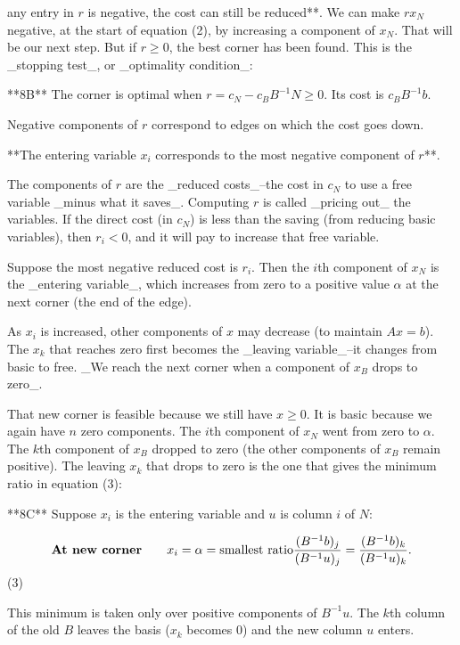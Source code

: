 any entry in \(r\) is negative, the cost can still be reduced**. We can make \(rx_{N}\) negative, at the start of equation (2), by increasing a component of \(x_{N}\). That will be our next step. But if \(r\geq 0\), the best corner has been found. This is the _stopping test_, or _optimality condition_:

**8B** The corner is optimal when \(r=c_{N}-c_{B}B^{-1}N\geq 0\). Its cost is \(c_{B}B^{-1}b\).

Negative components of \(r\) correspond to edges on which the cost goes down.

**The entering variable \(x_{i}\) corresponds to the most negative component of \(r\)**.

The components of \(r\) are the _reduced costs_--the cost in \(c_{N}\) to use a free variable _minus what it saves_. Computing \(r\) is called _pricing out_ the variables. If the direct cost (in \(c_{N}\)) is less than the saving (from reducing basic variables), then \(r_{i}<0\), and it will pay to increase that free variable.

Suppose the most negative reduced cost is \(r_{i}\). Then the \(i\)th component of \(x_{N}\) is the _entering variable_, which increases from zero to a positive value \(\alpha\) at the next corner (the end of the edge).

As \(x_{i}\) is increased, other components of \(x\) may decrease (to maintain \(Ax=b\)). The \(x_{k}\) that reaches zero first becomes the _leaving variable_--it changes from basic to free. _We reach the next corner when a component of \(x_{B}\) drops to zero_.

That new corner is feasible because we still have \(x\geq 0\). It is basic because we again have \(n\) zero components. The \(i\)th component of \(x_{N}\) went from zero to \(\alpha\). The \(k\)th component of \(x_{B}\) dropped to zero (the other components of \(x_{B}\) remain positive). The leaving \(x_{k}\) that drops to zero is the one that gives the minimum ratio in equation (3):

**8C** Suppose \(x_{i}\) is the entering variable and \(u\) is column \(i\) of \(N\):

\[\mbox{\bf At new corner}\qquad x_{i}=\alpha=\mbox{smallest ratio}\frac{(B^{-1} b)_{j}}{(B^{-1}u)_{j}}=\frac{(B^{-1}b)_{k}}{(B^{-1}u)_{k}}.\] (3)

This minimum is taken only over positive components of \(B^{-1}u\). The \(k\)th column of the old \(B\) leaves the basis (\(x_{k}\) becomes 0) and the new column \(u\) enters.

